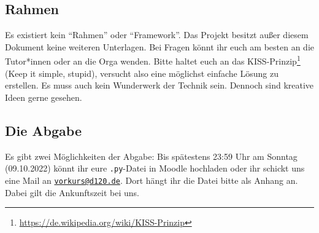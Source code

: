 \clearpage
\subsection*{Rahmen}
Es existiert kein \enquote{Rahmen} oder \enquote{Framework}.
Das Projekt besitzt außer diesem Dokument keine weiteren Unterlagen.
Bei Fragen könnt ihr euch am besten an die Tutor*innen oder an die Orga wenden.
Bitte haltet euch an das KISS-Prinzip\footnote[2]{\url{https://de.wikipedia.org/wiki/KISS-Prinzip}} (Keep it simple, stupid), versucht also eine möglichst einfache Lösung zu erstellen.
Es muss auch kein Wunderwerk der Technik sein.
Dennoch sind kreative Ideen gerne gesehen.

\subsection*{Die Abgabe}
Es gibt zwei Möglichkeiten der Abgabe: Bis spätestens 23:59 Uhr am Sonntag (09.10.2022) könnt ihr eure \texttt{.py}-Datei in Moodle hochladen oder ihr schickt uns eine Mail an \href{mailto:vorkurs@d120.de}{\nolinkurl{vorkurs@d120.de}}.
Dort hängt ihr die Datei bitte als Anhang an.
Dabei gilt die Ankunftszeit bei uns.

